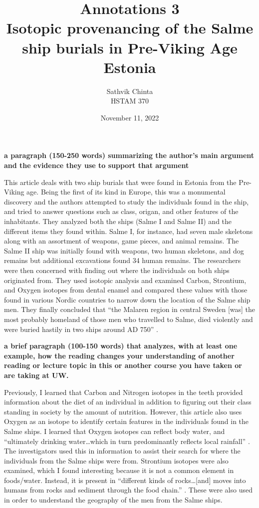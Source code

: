 \documentclass[a4paper]{article}
\title {
	Annotations 3\\ Isotopic provenancing of the Salme ship burials in Pre-Viking Age Estonia
}
\author {
	\normalsize Sathvik Chinta\\\normalsize
    \normalsize HSTAM 370\\\normalsize
}
\date {
	\color{black} November 11, 2022
}
\begin{document}
 \maketitle

        \textbf{a paragraph (150-250 words) summarizing the author's main argument and the evidence they use to support that argument}
        
        This article deals with two ship burials that were found in Estonia from the Pre-Viking age. Being the first of its kind in Europe,
        this was a monumental discovery and the authors attempted to study the individuals found in the ship, and tried to answer questions
        such as class, origan, and other features of the inhabitants. They analyzed both the ships (Salme I and Salme II) and the 
        different items they found within. Salme I, for instance, had seven male skeletons along with an assortment of weapons, 
        game pieces, and animal remains. The Salme II ship was initially found with weapons, two human skeletons, and dog remains
        but additional excavations found 34 human remains. The researchers were then concerned with finding out where the 
        individuals on both ships originated from. They used isotopic analysis and examined Carbon, Strontium, and Oxygen 
        isotopes from dental enamel and compared these values with those found in various Nordic countries to narrow down 
        the location of the Salme ship men. They finally concluded that “the Malaren region in central Sweden [was] the most 
        probably homeland of those men who travelled to Salme, died violently and were buried hastily in two ships around AD 750” 
        \citep{PriceT.Douglas2016Ipot}. 

        \textbf{a brief paragraph (100-150 words) that analyzes, with at least one example, how the reading changes your understanding of another reading or lecture topic in this or another course you have taken or are taking at UW.}

        Previously, I learned that Carbon and Nitrogen isotopes in the teeth provided information about the diet of an individual
        in addition to figuring out their class standing in society by the amount of nutrition. However, this article also uses
        Oxygen as an isotope to identify certain features in the individuals found in the Salme ships. I learned that Oxygen 
        isotopes can reflect body water, and “ultimately drinking water…which in turn predominantly reflects local rainfall” 
        \citep{PriceT.Douglas2016Ipot}. The investigators used this in information to assist their search for where the individuals from 
        the Salme ships were from. Strontium isotopes were also examined, which I found interesting because it is not a common
        element in foods/water. Instead, it is present in “different kinds of rocks…[and] moves into humans from rocks and
        sediment through the food chain.” \citep{PriceT.Douglas2016Ipot}. These were also used in order to understand the geography 
        of the men from the Salme ships. 

        \pagebreak
        
        
        \cite{PriceT.Douglas2016Ipot}
\end{document}
